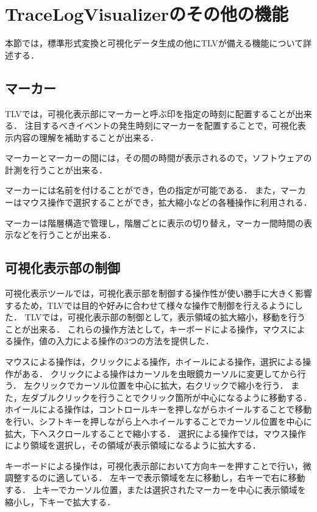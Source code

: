 \section{TraceLogVisualizerのその他の機能}

本節では，標準形式変換と可視化データ生成の他にTLVが備える機能について詳述する．

\subsection{マーカー}
TLVでは，可視化表示部にマーカーと呼ぶ印を指定の時刻に配置することが出来る．
注目するべきイベントの発生時刻にマーカーを配置することで，可視化表示内容の理解を補助することが出来る．

マーカーとマーカーの間には，その間の時間が表示されるので，ソフトウェアの計測を行うことが出来る．

マーカーには名前を付けることができ，色の指定が可能である．
また，マーカーはマウス操作で選択することができ，拡大縮小などの各種操作に利用される．

マーカーは階層構造で管理し，階層ごとに表示の切り替え，マーカー間時間の表示などを行うことが出来る．

\subsection{可視化表示部の制御}

可視化表示ツールでは，可視化表示部を制御する操作性が使い勝手に大きく影響するため，TLVでは目的や好みに合わせて様々な操作で制御を行えるようにした．
TLVでは，可視化表示部の制御として，表示領域の拡大縮小，移動を行うことが出来る．
これらの操作方法として，キーボードによる操作，マウスによる操作，値の入力による操作の3つの方法を提供した．

マウスによる操作は，クリックによる操作，ホイールによる操作，選択による操作がある．
クリックによる操作はカーソルを虫眼鏡カーソルに変更してから行う．
左クリックでカーソル位置を中心に拡大，右クリックで縮小を行う．
また，左ダブルクリックを行うことでクリック箇所が中心になるように移動する．
ホイールによる操作は，コントロールキーを押しながらホイールすることで移動を行い、シフトキーを押しながら上へホイールすることでカーソル位置を中心に拡大，下へスクロールすることで縮小する．
選択による操作では，マウス操作により領域を選択し，その領域が表示領域になるように拡大する．

キーボードによる操作は，可視化表示部において方向キーを押すことで行い，微調整するのに適している．
左キーで表示領域を左に移動し，右キーで右に移動する．
上キーでカーソル位置，または選択されたマーカーを中心に表示領域を縮小し，下キーで拡大する．

